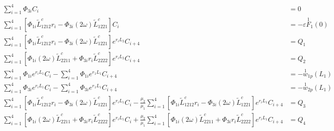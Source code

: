 \documentclass[11pt]{report}
\begin{document}
\begin{appendices}
\begin{small}
\begin{equation}
\begin{aligned}
\sum_{i = 1}^{4} \Phi_{3i} C_i &= 0 \\
\sum_{i = 1}^{4} \left[ \Phi_{1i} \tilde{L}^c_{1212} r_i - \Phi_{3i} (2 \omega) \tilde{L}^c_{1221} \right ] C_i &= - \varepsilon \overset{1}{F}_1(0) \\ 
\sum_{i = 1}^{4} \left[ \Phi_{1i} \tilde{L}^c_{1212} r_i - \Phi_{3i} (2 \omega) \tilde{L}^c_{1221} \right ]e^{r_i L_2} C_{i+4} &= Q_1 \\
\sum_{i = 1}^{4} \left[ \Phi_{1i} (2 \omega) \tilde{L}^c_{2211} + \Phi_{3i} r_i \tilde{L}^c_{2222} \right ]e^{r_i L_2} C_{i+4} &= Q_2 \\
\sum_{i = 1}^{4} \Phi_{1i} e^{r_i L_1} C_i - \sum_{i = 1}^{4} \Phi_{1i} e^{r_1 L_1} C_{i+4} &= - \overset{1}{w}_{1p}(L_1) \\
\sum_{i = 1}^{4} \Phi_{3i} e^{r_i L_1} C_i - \sum_{i = 1}^{4} \Phi_{3i} e^{r_1 L_1} C_{i+4} &= - \overset{1}{w}_{2p}(L_1) \\
\sum_{i = 1}^{4} \left[ \Phi_{1i} \tilde{L}^c_{1212} r_i - \Phi_{3i} (2 \omega) \tilde{L}^c_{1221} \right ]e^{r_i L_1} C_{i} - \frac{\mu_2}{\mu_1} \sum_{i = 1}^{4} \left[ \Phi_{1i} \tilde{L}^c_{1212} r_i - \Phi_{3i} (2 \omega) \tilde{L}^c_{1221} \right ]e^{r_i L_1} C_{i+4} &= Q_3 \\
\sum_{i = 1}^{4} \left[ \Phi_{1i} (2 \omega) \tilde{L}^c_{2211} + \Phi_{3i} r_i \tilde{L}^c_{2222} \right]e^{r_i L_1} C_{i} + \frac{\mu_2}{\mu_1}\sum_{i = 1}^{4} \left [ \Phi_{1i} (2 \omega) \tilde{L}^c_{2211} + \Phi_{3i} r_i \tilde{L}^c_{2222} \right ]e^{r_i L_1} C_{i+4} &=  Q_4
\end{aligned}
\end{equation}
\end{small}


\end{appendices}
\end{document}
